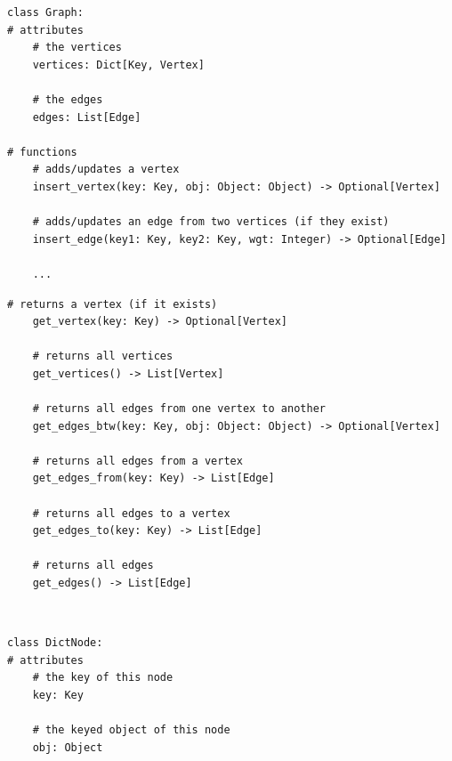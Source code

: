 \documentclass[mathserif, handout]{beamer}
\begin{document}
\begin{frame}[fragile]
  \vspace{-6mm}
  \begin{thmboxside}
    \begin{lstlisting}[style=mypython]
class Graph:
# attributes
    # the vertices
    vertices: Dict[Key, Vertex]

    # the edges
    edges: List[Edge]

# functions
    # adds/updates a vertex
    insert_vertex(key: Key, obj: Object: Object) -> Optional[Vertex]
    
    # adds/updates an edge from two vertices (if they exist)
    insert_edge(key1: Key, key2: Key, wgt: Integer) -> Optional[Edge]

    ...
\end{lstlisting}
  \end{thmboxside}
\end{frame}

\begin{frame}[fragile]
  \vspace{-9mm}
  \begin{thmboxbot}
    \begin{lstlisting}[style=mypython, firstnumber=last]
    # returns a vertex (if it exists)
    get_vertex(key: Key) -> Optional[Vertex]

    # returns all vertices
    get_vertices() -> List[Vertex]
    
    # returns all edges from one vertex to another
    get_edges_btw(key: Key, obj: Object: Object) -> Optional[Vertex]
    
    # returns all edges from a vertex
    get_edges_from(key: Key) -> List[Edge]

    # returns all edges to a vertex
    get_edges_to(key: Key) -> List[Edge]

    # returns all edges
    get_edges() -> List[Edge]
\end{lstlisting}
  \end{thmboxbot}
\end{frame}

\begin{frame}[fragile]
  \begin{thmboxtop}
     \\
    \begin{lstlisting}[style=mypython]
class DictNode:
# attributes
    # the key of this node
    key: Key

    # the keyed object of this node
    obj: Object
\end{lstlisting}
  \end{thmboxtop}
\end{frame}
\end{document}
